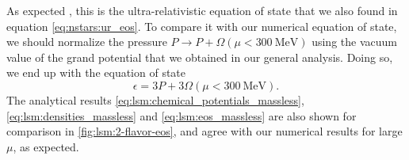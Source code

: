 As expected , this is the ultra-relativistic equation of state that we also found in equation \eqref{eq:nstars:ur_eos}.
To compare it with our numerical equation of state, we should normalize the pressure $P \rightarrow P + \Omega(\mu<\SI{300}{\mega\electronvolt})$ using the vacuum value of the grand potential that we obtained in our general analysis.
Doing so, we end up with the equation of state
\begin{equation}
	\epsilon = 3 P + 3 \Omega(\mu<\SI{300}{\mega\electronvolt}).
\label{eq:lsm:eos_massless}
\end{equation}
The analytical results \eqref{eq:lsm:chemical_potentials_massless}, \eqref{eq:lsm:densities_massless} and \eqref{eq:lsm:eos_massless} are also shown for comparison in \cref{fig:lsm:2-flavor-eos}, and agree with our numerical results for large $\mu$, as expected.

